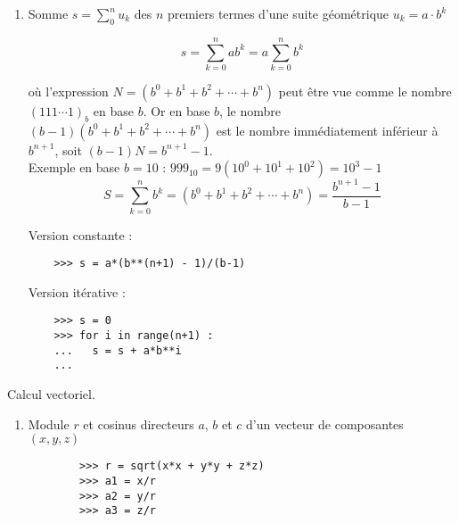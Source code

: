\begin{description}
\begin{enumerate}
	\begin{py}{6cm}
	Version constante :
	\begin{verbatim}
	>>> s = a*(n+1) + b*n*(n+1)/2
	\end{verbatim}
	\end{py}
	\hfill
	\begin{py}{6cm}
	Version itérative :
	\begin{verbatim}
	>>> s = 0
	>>> for i in range(n+1) :
	...   s = s + a + b*i
	... 
	\end{verbatim}
	\end{py}

	\item Somme $s = \sum_0^n u_k$ des $n$ premiers termes d'une suite 
		géométrique $u_k = a\cdot b^k$

	$$\displaystyle s = \sum_{k=0}^n ab^k = a\sum_{k=0}^n b^k$$

	où l'expression $\displaystyle N = (b^0+b^1+b^2+\cdots+b^n)$ peut être vue comme le nombre 
	$\displaystyle (111\cdots 1)_b$ en base $b$. Or en base $b$, le nombre $\displaystyle (b-1)(b^0+b^1+b^2+\cdots+b^n)$
	est le nombre immédiatement inférieur à $\displaystyle b^{n+1}$, soit $\displaystyle (b-1)N =
	b^{n+1}-1$.\\
	Exemple en base $b=10$ : $999_{10} = 9(10^0 + 10^1 + 10^2) = 10^3 - 1$
	$$\displaystyle S = \sum_{k=0}^n b^k = (b^0+b^1+b^2+\cdots+b^n) = \frac{b^{n+1}-1}{b-1}$$

	\begin{py}{6cm}
	Version constante :
	\begin{verbatim}
	>>> s = a*(b**(n+1) - 1)/(b-1)
	\end{verbatim}
	\end{py}
	\begin{py}{6cm}
	Version itérative :
	\begin{verbatim}
	>>> s = 0
	>>> for i in range(n+1) :
	...   s = s + a*b**i
	... 
	\end{verbatim}
	\end{py}
	\end{enumerate}
	
\item[TD \ref{td:vecteurs} :] Calcul vectoriel.
	\begin{enumerate}
	\item Module $r$ et cosinus directeurs $a$, $b$ et $c$
		d'un vecteur de composantes $(x,y,z)$

		\begin{py}{12cm}
		\begin{verbatim}
		>>> r = sqrt(x*x + y*y + z*z)
		>>> a1 = x/r
		>>> a2 = y/r
		>>> a3 = z/r
		\end{verbatim}
		\end{py}


\end{enumerate}
\end{description}
